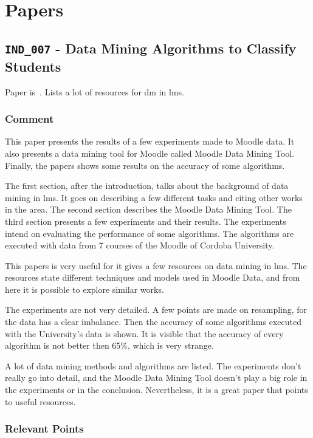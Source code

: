 \chapter{Papers}

\section{\texttt{IND\_007} - Data Mining Algorithms to Classify Students}

Paper is~\cite{ind_007}. Lists a lot of resources for \gls{dm} in \gls{lms}.

\subsection{Comment}

This paper presents the results of a few experiments made to Moodle data. It
also presents a data mining tool for Moodle called Moodle Data Mining Tool.
Finally, the papers shows some results on the accuracy of some algorithms.

The first section, after the introduction, talks about the background of data
mining in \gls{lms}. It goes on describing a few different tasks and citing
other works in the area. The second section describes the Moodle Data Mining
Tool. The third section presents a few experiments and their results. The
experiments intend on evaluating the performance of some algorithms. The
algorithms are executed with data from 7 courses of the Moodle of Cordoba
University.

This papers is very useful for it gives a few resources on data mining in
\gls{lms}. The resources state different techniques and models used in Moodle
Data, and from here it is possible to explore similar works.

The experiments are not very detailed. A few points are made on resampling, for
the data has a clear imbalance. Then the accuracy of some algorithms executed
with the University's data is shown. It is visible that the accuracy of every
algorithm is not better then 65\%, which is very strange.

A lot of data mining methods and algorithms are listed. The experiments don't
really go into detail, and the Moodle Data Mining Tool doesn't play a big role
in the experiments or in the conclusion. Nevertheless, it is a great paper that
points to useful resources.

\subsection{Relevant Points}

